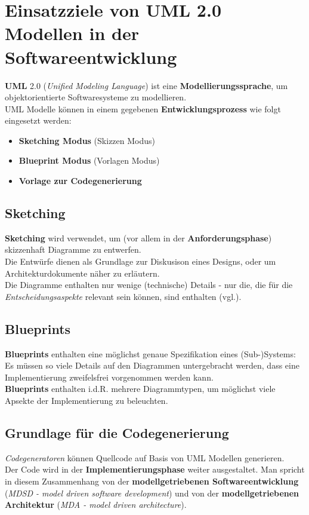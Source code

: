\section{Einsatzziele von UML 2.0 Modellen in der Softwareentwicklung}

\textbf{UML} 2.0 (\textit{Unified Modeling Language}) ist eine \textbf{Modellierungssprache}, um objektorientierte Softwaresysteme zu modellieren.\\

\noindent
UML Modelle können in einem gegebenen \textbf{Entwicklungsprozess} wie folgt eingesetzt werden:

\begin{itemize}
    \item \textbf{Sketching Modus} (Skizzen Modus)
    \item \textbf{Blueprint Modus} (Vorlagen Modus)
    \item \textbf{Vorlage zur Codegenerierung}
\end{itemize}

\subsection*{Sketching}
\textbf{Sketching} wird verwendet, um (vor allem in der \textbf{Anforderungsphase}) skizzenhaft Diagramme zu entwerfen.\\
Die Entwürfe dienen als Grundlage zur Diskusison eines Designs, oder um Architekturdokumente näher zu erläutern.\\
Die Diagramme enthalten nur wenige (technische) Details - nur die, die für die \textit{Entscheidungsaspekte} relevant sein können, sind enthalten (vgl.\cite[2]{Buh09}).

\subsection*{Blueprints}
\textbf{Blueprints} enthalten eine möglichst genaue Spezifikation eines (Sub-)Systems: Es müssen so viele Details auf den Diagrammen untergebracht werden, dass eine Implementierung zweifelsfrei vorgenommen werden kann.\\
\textbf{Blueprints} enthalten i.d.R. mehrere Diagrammtypen, um möglichst viele Apsekte der Implementierung zu beleuchten.

\subsection*{Grundlage für die Codegenerierung}
\textit{Codegeneratoren} können Quellcode auf Basis von UML Modellen generieren.\\
Der Code wird in der \textbf{Implementierungsphase} weiter ausgestaltet.
Man spricht in diesem Zusammenhang von der \textbf{modellgetriebenen Softwareentwicklung} (\textit{MDSD - model driven software development}) und von der \textbf{modellgetriebenen Architektur} (\textit{MDA - model driven architecture}).

